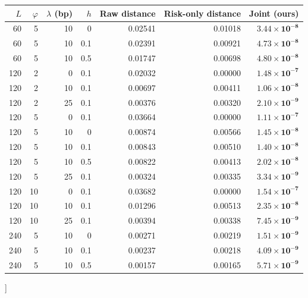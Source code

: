 \documentclass[sigconf,anonymous,review]{acmart}
\begin{document}
{\begin{center}
\label{tab:fullrobust}
\begin{tabular}{rrrrrrr}\toprule
$L$ & $\varphi$ & $\lambda$ (bp) & $h$ & Raw distance & Risk-only distance & \textbf{Joint (ours)}\\\midrule
60 & 5 & 10 & 0 & 0.02541 & 0.01018 & $\mathbf{3.44\times10^{-8}}$ \\
60 & 5 & 10 & 0.1 & 0.02391 & 0.00921 & $\mathbf{4.73\times10^{-8}}$ \\
60 & 5 & 10 & 0.5 & 0.01747 & 0.00698 & $\mathbf{4.80\times10^{-8}}$ \\
\midrule
120 & 2 & 0 & 0.1 & 0.02032 & 0.00000 & $\mathbf{1.48\times10^{-7}}$ \\
120 & 2 & 10 & 0.1 & 0.00697 & 0.00411 & $\mathbf{1.06\times10^{-8}}$ \\
120 & 2 & 25 & 0.1 & 0.00376 & 0.00320 & $\mathbf{2.10\times10^{-9}}$ \\
120 & 5 & 0 & 0.1 & 0.03664 & 0.00000 & $\mathbf{1.11\times10^{-7}}$ \\
120 & 5 & 10 & 0 & 0.00874 & 0.00566 & $\mathbf{1.45\times10^{-8}}$ \\
120 & 5 & 10 & 0.1 & 0.00843 & 0.00510 & $\mathbf{1.40\times10^{-8}}$ \\
120 & 5 & 10 & 0.5 & 0.00822 & 0.00413 & $\mathbf{2.02\times10^{-8}}$ \\
120 & 5 & 25 & 0.1 & 0.00324 & 0.00335 & $\mathbf{3.34\times10^{-9}}$ \\
120 & 10 & 0 & 0.1 & 0.03682 & 0.00000 & $\mathbf{1.54\times10^{-7}}$ \\
120 & 10 & 10 & 0.1 & 0.01296 & 0.00513 & $\mathbf{2.35\times10^{-8}}$ \\
120 & 10 & 25 & 0.1 & 0.00394 & 0.00338 & $\mathbf{7.45\times10^{-9}}$ \\
\midrule
240 & 5 & 10 & 0 & 0.00271 & 0.00219 & $\mathbf{1.51\times10^{-9}}$ \\
240 & 5 & 10 & 0.1 & 0.00237 & 0.00218 & $\mathbf{4.09\times10^{-9}}$ \\
240 & 5 & 10 & 0.5 & 0.00157 & 0.00165 & $\mathbf{5.71\times10^{-9}}$ \\
\bottomrule\end{tabular}
\end{center}
}]
\end{document}
